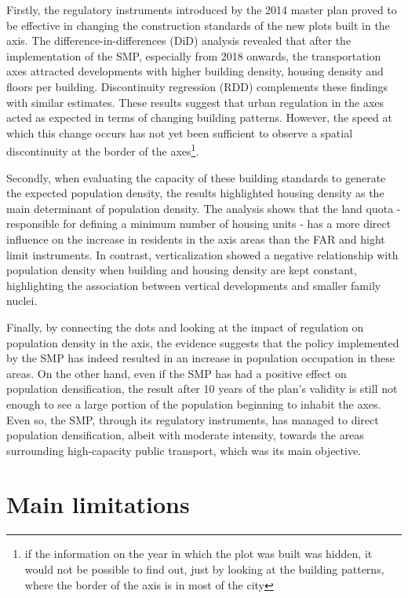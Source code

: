 Firstly, the regulatory instruments introduced by the 2014 master plan proved to be effective in changing the construction standards of the new plots built in the axis. The difference-in-differences (DiD) analysis revealed that after the implementation of the SMP, especially from 2018 onwards, the transportation axes attracted developments with higher building density, housing density and floors per building. Discontinuity regression (RDD) complements these findings with similar estimates. These results suggest that urban regulation in the axes acted as expected in terms of changing building patterns. However, the speed at which this change occurs has not yet been sufficient to observe a spatial discontinuity at the border of the axes\footnote{if the information on the year in which the plot was built was hidden, it would not be possible to find out, just by looking at the building patterns, where the border of the axis is in most of the city}.

Secondly, when evaluating the capacity of these building standards to generate the expected population density, the results highlighted housing density as the main determinant of population density. The analysis shows that the land quota - responsible for defining a minimum number of housing units - has a more direct influence on the increase in residents in the axis areas than the FAR and hight limit instruments. In contrast, verticalization showed a negative relationship with population density when building and housing density are kept constant, highlighting the association between vertical developments and smaller family nuclei.

Finally, by connecting the dots and looking at the impact of regulation on population density in the axis, the evidence suggests that the policy implemented by the SMP has indeed resulted in an increase in population occupation in these areas. On the other hand, even if the SMP has had a positive effect on population densification, the result after 10 years of the plan's validity is still not enough to see a large portion of the population beginning to inhabit the axes. Even so, the SMP, through its regulatory instruments, has managed to direct population densification, albeit with moderate intensity, towards the areas surrounding high-capacity public transport, which was its main objective.  

\section{Main limitations}

